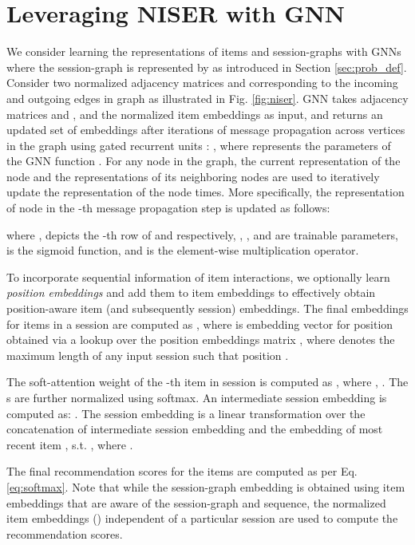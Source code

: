 \documentclass[sigconf]{acmart}
\begin{document}
\section{Leveraging NISER with GNN\label{ssec:niser-gnn}}
We consider learning the representations of items and session-graphs with GNNs where the session-graph is represented by  as introduced in Section \ref{sec:prob_def}. 
Consider two normalized adjacency matrices  and  corresponding to the incoming and outgoing edges in graph  as illustrated in Fig. \ref{fig:niser}.
GNN takes adjacency matrices  and , and the normalized item embeddings  as input, and returns an updated set of embeddings after  iterations of message propagation across vertices in the graph using gated recurrent units \cite{li2015gated}: , where  represents the parameters of the GNN function .
For any node in the graph, the current representation of the node and the representations of its neighboring nodes are used to iteratively update the representation of the node  times.
More specifically, the representation of node  in the -th message propagation step is updated as follows:





\iffalse

\fi

where ,  depicts the -th row of  and  respectively,  , ,  and  are trainable parameters,  is the sigmoid function, and  is the element-wise multiplication operator.




To incorporate sequential information of item interactions, we optionally learn \textit{position embeddings} and add them to item embeddings to effectively obtain position-aware item (and subsequently session) embeddings.
The final embeddings for items in a session are computed as , where  is embedding vector for position  obtained via a lookup over the position embeddings matrix , where  denotes the maximum length of any input session such that position .

The soft-attention weight of the -th item in session  is computed as
,
where , .
The s are further normalized using softmax.
An intermediate session embedding  is computed as:
.
The session embedding  is a linear transformation over the concatenation of intermediate session embedding  and the embedding of most recent item , s.t. , where .


The final recommendation scores for the  items are computed as per Eq. \ref{eq:softmax}.
Note that while the session-graph embedding is obtained using item embeddings  that are aware of the session-graph and sequence, the normalized item embeddings  () independent of a particular session are used to compute the recommendation scores.
\end{document}
